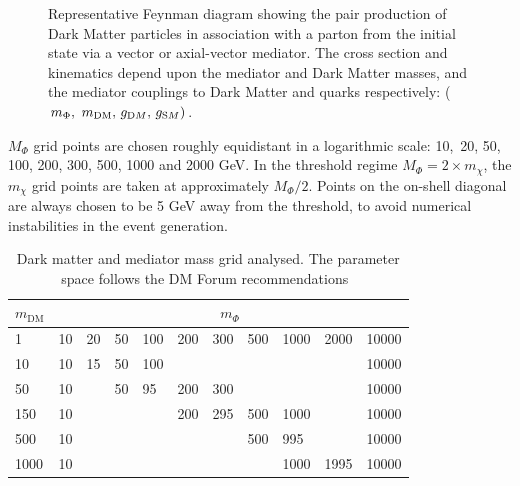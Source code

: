 \begin{figure}[h!]
  \centering
  \caption{Representative Feynman diagram showing the pair production of Dark Matter particles in association with a parton from the initial state via a vector or axial-vector mediator. The cross section and kinematics depend upon the mediator and Dark Matter masses, and the mediator couplings to Dark Matter and quarks respectively: ($m_{\Phi} ,\ m_\textrm{DM} ,\, g_{\textrm DM} ,\, g_{\textrm SM})$. \cite{Abercrombie:2015wmb}}
  \label{fig:feynman}
\end{figure}

$M_{\Phi}$ grid points are chosen roughly equidistant in a logarithmic scale: 10,~20, 50, 100, 200, 300, 500, 1000 and 2000 GeV. In the threshold regime $M_{\Phi} = 2 \times m_{\chi}$, the $ m_{\chi}$ grid points are taken at approximately $M_{\Phi}/2$. Points on the on-shell diagonal are always chosen to be
5 GeV away from the threshold, to avoid numerical instabilities in the event generation. 


\begin{table}[h!]
\centering
\begin{tabular}{l|llllllllll}\hline \hline
$m_\textrm{DM}$  & \multicolumn{10}{c}{$m_\Phi$}                                   \\ \hline
1    & 10 & 20 & 50 & 100 & 200 & 300 & 500 & 1000 & 2000 & 10000 \\
10   & 10 & 15 & 50 & 100 &     &     &     &      &      & 10000 \\
50   & 10 &    & 50 & 95  & 200 & 300 &     &      &      & 10000 \\
150  & 10 &    &    &     & 200 & 295 & 500 & 1000 &      & 10000 \\
500  & 10 &    &    &     &     &     & 500 & 995  &      & 10000 \\
1000 & 10 &    &    &     &     &     &     & 1000 & 1995 & 10000\\ \hline
\hline
\end{tabular}
\caption{Dark matter and mediator mass grid analysed. The parameter space follows the DM Forum recommendations~\cite{Abercrombie:2015wmb}}
\label{tab:DMgrid}
\end{table}

